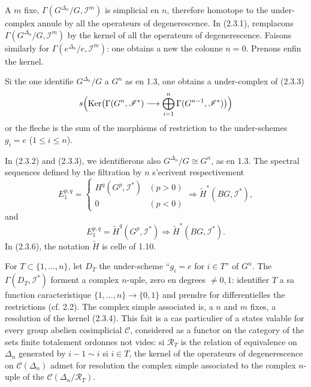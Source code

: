 \documentclass[11pt,a4paper]{article}
\theoremstyle{plain}
\theoremstyle{definition}
\DeclareMathOperator{\Ker}{Ker}
\begin{document}
A $m$ fixe, $\Gamma(G^{\Delta_n}/G, \mathscr{I}^m)$ is simplicial en $n$, therefore homotope to the under-complex annule by all the operateurs of degenerescence. In (2.3.1), remplacons $\Gamma(G^{\Delta_n}/G, \mathscr{I}^m)$ by the kernel of all the operateurs of degenerescence. Faisons similarly for $\Gamma(e^{\Delta_n}/e, \mathscr{I}^m)$: one obtains a new the colonne $n = 0$. Prenons enfin the kernel.

Si the one identifie $G^{\Delta_n}/G$ a $G^n$ as en 1.3, one obtains a under-complex of (2.3.3)
\begin{equation}\label{2.3.4}
s\Bigl(\Ker\bigl(\Gamma(G^n, \mathscr{I}^*) \longrightarrow \bigoplus_{i=1}^n \Gamma(G^{n-1}, \mathscr{I}^*)\bigr)\Bigr)
\end{equation}
or the fleche is the sum of the morphisms of restriction to the under-schemes $g_i = e$ ($1 \leq i \leq n$).

In (2.3.2) and (2.3.3), we identifierons also $G^{\Delta_n}/G \cong G^n$, as en 1.3. The spectral sequences defined by the filtration by $n$ s'ecrivent respectivement
\begin{equation}\label{2.3.5}
E_1^{p,q} =
\begin{cases}
H^q(G^p, \mathscr{I}^*) & (p > 0) \\
0 & (p < 0)
\end{cases}
\Rightarrow \widetilde{H}^*(BG, \mathscr{I}^*),
\end{equation}
and
\begin{equation}\label{2.3.6}
E_1^{p,q} = \widetilde{H}^q(G^p, \mathscr{I}^*) \Rightarrow \widetilde{H}^*(BG, \mathscr{I}^*).
\end{equation}
In (2.3.6), the notation $\widetilde{H}$ is celle of 1.10.

For $T \subset \{1, \ldots, n\}$, let $D_T$ the under-scheme ``$g_i = e$ for $i \in T$'' of $G^n$. The $\Gamma(D_T, \mathscr{I}^*)$ forment a complex $n$-uple, zero en degrees $\neq 0, 1$: identifier $T$ a sa function caracteristique $\{1, \ldots, n\} \to \{0, 1\}$ and prendre for differentielles the restrictions (cf. 2.2). The complex simple associated is, a $n$ and $m$ fixes, a resolution of the kernel (2.3.4). This fait is a cas particulier of a states valable for every group abelien cosimplicial $\mathscr{C}$, considered as a functor on the category of the sets finite totalement ordonnes not vides: si $\mathscr{R}_T$ is the relation of equivalence on $\Delta_n$ generated by $i - 1 \sim i$ si $i \in T$, the kernel of the operateurs of degenerescence on $\mathscr{C}(\Delta_n)$ admet for resolution the complex simple associated to the complex $n$-uple of the $\mathscr{C}(\Delta_n/\mathscr{R}_T)$.
\end{document}
